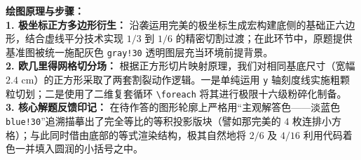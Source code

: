 \vspace{0.4cm}
{\small\color{blue!70!black}
\textbf{绘图原理与步骤：}\\
\textbf{1. 极坐标正方多边形衍生：} 沿袭运用完美的极坐标生成宏构建底侧的基础正六边形，结合虚线平分技术实现 $1/3$ 到 $1/6$ 的精密切割过渡；在此环节中，原题提供基准图被统一施配灰色 \texttt{gray!30} 透明图层充当环境前提背景。\\
\textbf{2. 欧几里得网格切分场：} 根据正方形切片映射原理，我们对相同基底尺寸（宽幅 $2.4\text{ cm}$）的正方形采取了两套割裂动作逻辑。一是单纯运用 \texttt{y} 轴刻度线实施粗颗粒切划；二是使用了二维复套循环 \texttt{\textbackslash foreach} 将其进行极限十六级粉碎化制备。\\
\textbf{3. 核心解题反馈印记：} 在待作答的图形轮廓上严格用“主观解答色——淡蓝色 \texttt{blue!30}”追溯描摹出了完全等比的等积投影版块（譬如那完美的 $4$ 枚连排小方格）；与此同时借由底部的等式渲染结构，极其自然地将 $2/6$ 及 $4/16$ 利用代码着色一并填入圆润的小括号之中。
}


